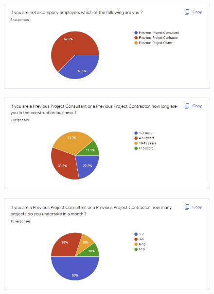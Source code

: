 	\begin{figure}[H]
    	\centering
    	\includegraphics[width=15cm]{q3.jpg}
    	\label{}
	\end{figure}
	
	\begin{figure}[H]
    	\centering
    	\includegraphics[width=15cm]{q4.jpg}
    	\label{}
	\end{figure}
	
	\begin{figure}[H]
    	\centering
    	\includegraphics[width=15cm]{q5.jpg}
    	\label{}
	\end{figure}
	
